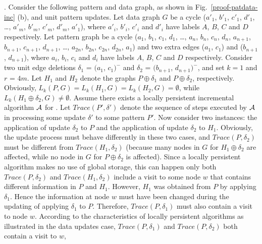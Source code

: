 \vspace{-1.5ex}
.
Consider the following pattern and data graph, as shown in Fig.~\ref{proof-patdata-inc} (b), and unit pattern updates.
Let data graph $G$ be a cycle ($a'_1$, $b'_1$, $c'_1$, $d'_1$, \ldots, $a'_m$, $b'_m$, $c'_m$, $d'_m$, $a'_1$),
where $a'_i$, $b'_i$, $c'_i$ and $d'_i$ have labels $A$, $B$, $C$ and $D$ respectively.
Let pattern graph be a cycle ($a_1$, $b_1$, $c_1$, $d_1$, \ldots, $a_n$, $b_n$, $c_n$, $d_n$, $a_{n+1}$, $b_{n+1}$, $c_{n+1}$, $d_{n+1}$, \ldots, $a_{2n}$, $b_{2n}$, $c_{2n}$, $d_{2n}$, $a_1$) and two extra edges ($a_1$, $c_1$) and ($b_{n+1}$, $d_{n+1}$),
where $a_i$, $b_i$, $c_i$ and $d_i$ have labels $A$, $B$, $C$ and $D$ respectively.
Consider two unit edge deletions $\delta_1$ = $(a_1$, $c_1)^-$ and $\delta_2$ = $(b_{n+1}$, $d_{n+1})^-$,
and set $k = 1$ and $r$ = $4m$.
Let $H_1$ and $H_2$ denote the graphs $P\oplus \delta_1$ and $P\oplus \delta_2$, respectively.
Obviously, $L_{k}(P, G) = L_{k}(H_1, G) = L_{k}(H_2, G) = \emptyset$,
while $L_{k}(H_1\oplus \delta_2, G) \neq \emptyset$.
Assume there exists a locally persistent incremental algorithm ${\cal A}$ for \dynteamF.
Let $Trace(P', \delta')$ denote the sequence of steps executed by ${\cal A}$ in processing some update $\delta'$ to some pattern $P'$.
Now consider two instances: the application of update $\delta_2$ to $P$ and the application of update $\delta_2$ to $H_1$.
Obviously, the update process must behave differently in these two cases, and $Trace(P, \delta_2)$ must be different from $Trace(H_1, \delta_2)$
(because many nodes in $G$ for $H_1\oplus \delta_2$ are affected, while no node in $G$ for $P\oplus \delta_2$ is affected).
Since a locally persistent algorithm makes no use of global storage,
this can happen only both $Trace(P, \delta_2)$ and $Trace(H_1, \delta_2)$ include a visit to some node $w$ that contains different information in $P$ and $H_1$.
However, $H_1$ was obtained from $P$ by applying $\delta_1$.
Hence the information at node $w$ must have been changed during the updating of applying $\delta_1$ to $P$.
Therefore, $Trace(P, \delta_1)$ must also contain a visit to node $w$.
According to the characteristics of locally persistent algorithms as illustrated in the data updates case,
$Trace(P, \delta_1)$ and $Trace(P, \delta_2)$ both contain a visit to $w$,

